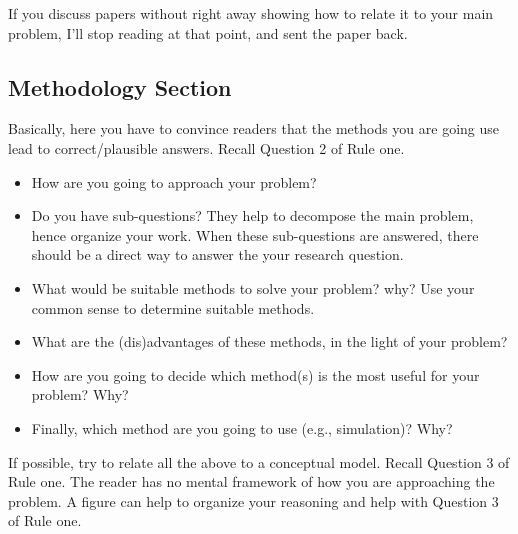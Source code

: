 \documentclass{article}
\begin{document}
If you discuss papers without right away showing how to relate it to your main problem, I'll stop  reading at that point, and sent the paper back. 

\subsection{Methodology Section}
\label{sec:methods-section}

Basically, here you have to convince readers that the methods you are
going use lead to correct/plausible answers. Recall Question 2 of Rule one.

\begin{itemize}
\item How are you going to approach your problem?
\item Do you have sub-questions? They help to decompose the main
  problem, hence organize your work. When these sub-questions are
  answered, there should be a direct way to answer the your research
  question. 
\item What would be suitable methods to solve your problem? why? Use
  your common sense to determine suitable methods.
\item What are the (dis)advantages of these methods, in the light of
  your problem?
\item How are you going to decide which method(s) is the most useful for your problem? Why?
\item Finally, which method are you going to use (e.g., simulation)?
  Why?
\end{itemize}

If possible, try to relate all the above to a conceptual model. Recall
Question 3 of Rule one. The reader has no mental framework of how you
are approaching the problem. A figure can help to organize your
reasoning and help with Question 3 of Rule one.
\end{document}
